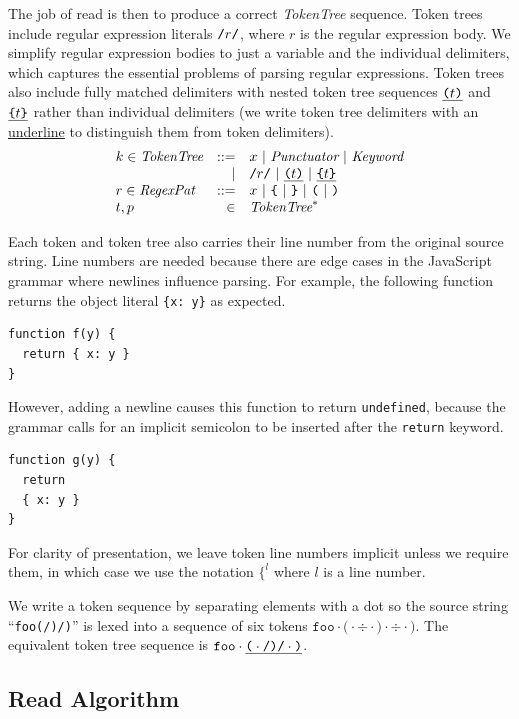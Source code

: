 \documentclass[preprint,10pt]{sigplanconf}
\begin{document}
The job of read is then to produce a correct \textit{TokenTree} sequence. Token trees include regular expression literals $\texttt{/}r\texttt{/}$, where $r$ is the regular expression body. We simplify regular expression bodies to just a variable and the individual delimiters, which captures the essential problems of parsing regular expressions.
Token trees also include fully matched delimiters with nested token tree sequences $\underline{ \texttt{(} t \texttt{)}}$ and $\underline{ \texttt{\{} t \texttt{\}} }$ rather than individual delimiters (we write token tree delimiters with an \underline{underline} to distinguish them from token delimiters).
\[
\begin{array}{lrl}
  k \in \textit{TokenTree} &::=& x ~|~ \textit{Punctuator} ~|~ \textit{Keyword}
  \\
  &|& \texttt{/}r\texttt{/} ~|~ \underline{ \texttt{(} t \texttt{)}} ~|~ \underline{ \texttt{\{} t \texttt{\}} }
  \\
  r \in \textit{RegexPat} &::=& x ~|~ \texttt{\{} ~|~ \texttt{\}}
  ~|~ \texttt{(} ~|~ \texttt{)}
  \\
  t,p &\in& \textit{TokenTree}^{*}
\end{array}
\]

Each token and token tree also carries their line number from the original source string. Line numbers are needed because there are edge cases in the JavaScript grammar 
where newlines influence parsing.
For example,
the following function returns the object literal \verb!{x: y}! as expected. 
\begin{lstlisting}
function f(y) {
  return { x: y }
}
\end{lstlisting}
However, adding a newline causes this function to 
return \verb!undefined!, because the grammar calls for an implicit semicolon to be inserted after the \verb!return! keyword.
\begin{lstlisting}
function g(y) {
  return 
  { x: y }
}
\end{lstlisting}
For clarity of presentation, we leave token line numbers implicit unless we require them, in which case we use the notation $\texttt{\{}^l$ where $l$ is a line number.

We write a token sequence by separating elements with a dot so
the source string ``\texttt{foo(/)/)}'' 
is lexed into a sequence
of six tokens \( \texttt{foo}\cdot \texttt{(} \cdot \div \cdot \texttt{)}
\cdot \div \cdot \texttt{)} \). The equivalent token tree sequence is
\(
\texttt{foo} \cdot \underline{ \texttt{(} \cdot \texttt{/} \texttt{)} \texttt{/} \cdot  \texttt{)}}
\).

\subsection{Read Algorithm}
\end{document}
